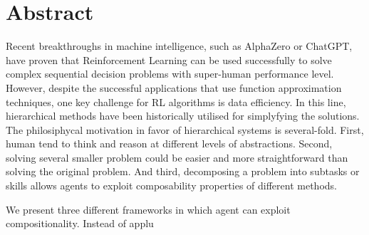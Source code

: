 \chapter*{Abstract}

Recent breakthroughs in machine intelligence, such as AlphaZero or ChatGPT, have proven that Reinforcement Learning can be used successfully to solve complex sequential decision problems with super-human performance level. However, despite the successful applications that use function approximation techniques, one key challenge for RL algorithms is data efficiency. In this line, hierarchical methods have been historically utilised for simplyfying the solutions. The philosiphycal motivation in favor of hierarchical systems is several-fold. First, human tend to think and reason at different levels of abstractions. Second, solving several smaller problem could be easier and more straightforward than solving the original problem. And third, decomposing a problem into subtasks or skills allows agents to exploit composability properties of different methods.

We present three different frameworks in which agent can exploit compositionality. Instead of applu